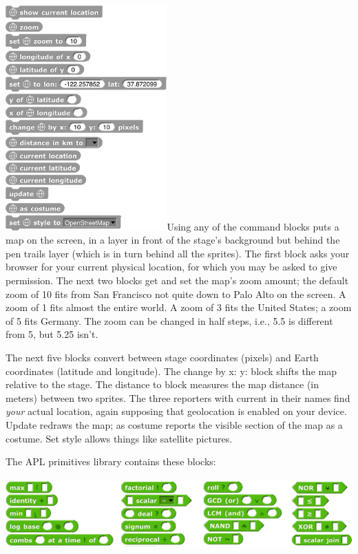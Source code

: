 \includegraphics[width=2.44236in,height=3.40278in]{media/image473.png}Using
any of the command blocks puts a map on the screen, in a layer in front
of the stage's background but behind the pen trails layer (which is in
turn behind all the sprites). The first block asks your browser for your
current physical location, for which you may be asked to give
permission. The next two blocks get and set the map's zoom amount; the
default zoom of 10 ﬁts from San Francisco not quite down to Palo Alto on
the screen. A zoom of 1 ﬁts almost the entire world. A zoom of 3 fits
the United States; a zoom of 5 ﬁts Germany. The zoom can be changed in
half steps, i.e., 5.5 is different from 5, but 5.25 isn't.

The next five blocks convert between stage coordinates (pixels) and
Earth coordinates (latitude and longitude). The change by x: y: block
shifts the map relative to the stage. The distance to block measures the
map distance (in meters) between two sprites. The three reporters with
current in their names find \emph{your} actual location, again supposing
that geolocation is enabled on your device. Update redraws the map; as
costume reports the visible section of the map as a costume. Set style
allows things like satellite pictures.

The APL primitives library contains these blocks:

\includegraphics[width=5.73333in,height=1.11333in]{media/image474.png}

